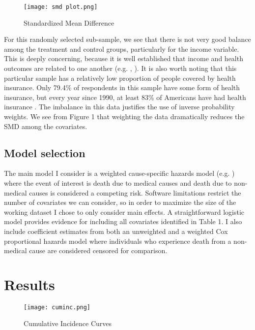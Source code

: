 \documentclass{article}
\begin{document}
\begin{figure}[h!]
    \centering
    \caption{Standardized Mean Difference}
    \texttt{[image: smd plot.png]}
    \label{fig:my_label}
\end{figure}

For this randomly selected sub-sample, we see that there is not very good balance among the treatment and control groups, particularly for the income variable. This is deeply concerning, because it is well established that income and health outcomes are related to one another (e.g. \cite{ettner1996new}, \cite{marmot2002influence}). It is also worth noting that this particular sample has a relatively low proportion of people covered by health insurance. Only 79.4\% of respondents in this sample have some form of health insurance, but every year since 1990, at least 83\% of Americans have had health insurance \parencite{insurance}. The imbalance in this data justifies the use of inverse probability weights. We see from Figure 1 that weighting the data dramatically reduces the SMD among the covariates. 

\subsection{Model selection}
The main model I consider is a weighted cause-specific hazards model (e.g. \cite{geskus2011cause}) where the event of interest is death due to medical causes and death due to non-medical causes is considered a competing risk. Software limitations restrict the number of covariates we can consider, so in order to maximize the size of the working dataset I chose to only consider main effects. A straightforward logistic model provides evidence for including all covariates identified in Table 1. I also include coefficient estimates from both an unweighted and a weighted Cox proportional hazards model where individuals who experience death from a non-medical cause are considered censored for comparison. 

\section{Results}

\begin{figure}[h!]
    \centering
    \caption{Cumulative Incidence Curves}
    \texttt{[image: cuminc.png]}
    \label{fig:my_label}
\end{figure}
\end{document}
